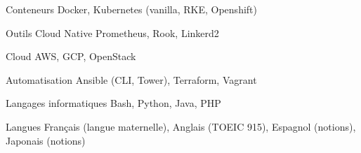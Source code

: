 

\begin{cvskills}

  \cvskill
    {Conteneurs} %
    {Docker, Kubernetes (vanilla, RKE, Openshift)} %

  \cvskill
    {Outils Cloud Native} %
    {Prometheus, Rook, Linkerd2} %

  \cvskill
    {Cloud} %
    {AWS, GCP, OpenStack} %

  \cvskill
    {Automatisation} %
    {Ansible (CLI, Tower), Terraform, Vagrant} %

  \cvskill
    {Langages informatiques} %
    {Bash, Python, Java, PHP} %

  \cvskill
    {Langues} %
    {Français (langue maternelle), Anglais (TOEIC 915), Espagnol (notions), Japonais (notions)} %

\end{cvskills}
